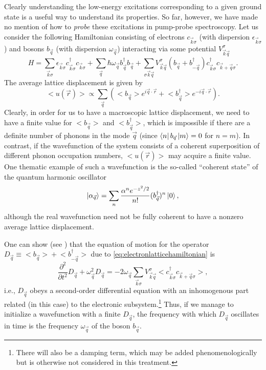 Clearly understanding the low-energy excitations corresponding to a given ground state is a useful way to understand its properties.
So far, however, we have made no mention of how to \emph{probe} these excitations in pump-probe spectroscopy.
Let us consider the following Hamiltonian consisting of electrons $c_{\vec{k}\sigma}$ (with dispersion $\epsilon_{\vec{k}\sigma}$) and bosons $b_{\vec{q}}$ (with dispersion $\omega_{\vec{q}}$) interacting via some potential $V^\sigma_{\vec{k}\vec{q}}$
\begin{equation}\label{eq:electronlatticehamiltonian}
H = \sum_{\vec{k}\sigma}\epsilon_{\vec{k}\sigma}c^\dagger_{\vec{k}\sigma}c_{\vec{k}\sigma}
+\sum_{\vec{q}}\hbar \omega_{\vec{q}}b^\dagger_{\vec{q}}b_{\vec{q}}
+\sum_{\sigma\vec{k}\vec{q}}V^\sigma_{\vec{k}\vec{q}}\left(b_{\vec{q}}+b^\dagger_{-\vec{q}}\right)c^\dagger_{\vec{k}\sigma}c_{\vec{k}+\vec{q}\sigma}.
\end{equation}
The average lattice displacement is given by
\begin{equation}
\big<u(\vec{r})\big> \propto \sum_{\vec{q}}\left(\big<b_{\vec{q}}\big>e^{i\vec{q}\cdot\vec{r}}+\big<b^\dagger_{\vec{q}}\big>e^{-i\vec{q}\cdot\vec{r}}\right).
\end{equation}
Clearly, in order for us to have a macroscopic lattice displacement, we need to have a finite value for $\big<b_{\vec{q}}\big>$ and $\big<b^\dagger_{\vec{q}}\big>$, which is impossible if there are a definite number of phonons in the mode $\vec{q}$ (since $\bra{n}b_{\vec{q}}\ket{m}=0$ for $n=m$).
In contrast, if the wavefunction of the system consists of a coherent superposition of different phonon occupation numbers, $\big<u(\vec{r})\big>$ may acquire a finite value.
One thematic example of such a wavefunction is the so-called ``coherent state'' of the quantum harmonic oscillator
\begin{equation}\label{eq:coherentstate}
\ket{\alpha_{\vec{q}}} = \sum_n \frac{\alpha^ne^{-z^2/2}}{n!}(b^\dagger_{\vec{q}})^n\ket{0},
\end{equation}
although the real wavefunction need not be fully coherent to have a nonzero average lattice displacement.

One can show (see \citet{kuznetsov_theory_1994}) that the equation of motion for the operator $D_{\vec{q}}\equiv \big<b_{\vec{q}}\big>+\big<b^\dagger_{-\vec{q}}\big>$ due to \cref{eq:electronlatticehamiltonian} is
\begin{equation}\label{eq:coherentoscillationwaveequation}
\frac{\partial^2}{\partial t^2}D_{\vec{q}}+\omega^2_{\vec{q}}D_{\vec{q}} = -2\omega_{\vec{q}}\sum_{\vec{k}\sigma}V^\sigma_{\vec{k}\vec{q}}\big<c^\dagger_{\vec{k}\sigma} c_{\vec{k}+\vec{q}\sigma}\big>,
\end{equation}
i.e., $D_{\vec{q}}$ obeys a second-order differential equation with an inhomogenous part related (in this case) to the electronic subsystem.\footnote{There will also be a damping term, which may be added phenomenologically but is otherwise not considered in this treatment.}
Thus, if we manage to initialize a wavefunction with a finite $D_{\vec{q}}$, the frequency with which $D_{\vec{q}}$ oscillates in time is the frequency $\omega_{\vec{q}}$ of the boson $b_{\vec{q}}$.

